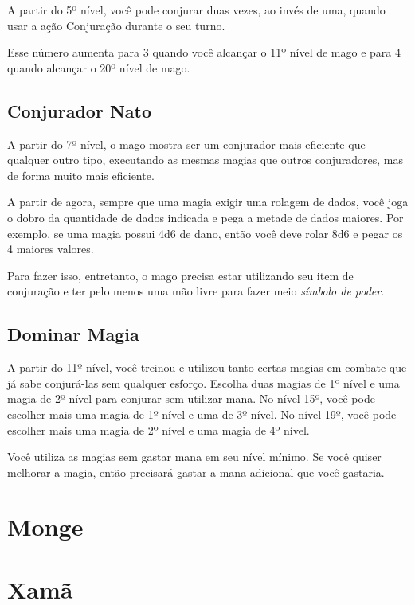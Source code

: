 \documentclass{RPG_Adventure}[2021/10/20]
\begin{document}
\begin{multicols}{2}
A partir do 5º nível, você pode conjurar duas vezes, ao invés de uma, quando
usar a ação Conjuração durante o seu turno.

Esse número aumenta para 3 quando você alcançar o 11º nível de mago e para 4
quando alcançar o 20º nível de mago.

\section*{Conjurador Nato}%
\label{sec:conjurador_nato}

A partir do 7º nível, o mago mostra ser um conjurador mais eficiente que
qualquer outro tipo, executando as mesmas magias que outros conjuradores, mas de
forma muito mais eficiente.

A partir de agora, sempre que uma magia exigir uma rolagem de dados, você joga o
dobro da quantidade de dados indicada e pega a metade de dados maiores. Por
exemplo, se uma magia possui 4d6 de dano, então você deve rolar 8d6 e pegar os
4 maiores valores.

Para fazer isso, entretanto, o mago precisa estar utilizando seu item de
conjuração e ter pelo menos uma mão livre para fazer meio \textit{símbolo de
poder}.

\section*{Dominar Magia}%

A partir do 11º nível, você treinou e utilizou tanto certas magias em combate
que já sabe conjurá-las sem qualquer esforço. Escolha duas magias de 1º nível e
uma magia de 2º nível para conjurar sem utilizar mana. No nível 15º, você pode
escolher mais uma magia de 1º nível e uma de 3º nível. No nível 19º, você pode
escolher mais uma magia de 2º nível e uma magia de 4º nível.

Você utiliza as magias sem gastar mana em seu nível mínimo. Se você quiser
melhorar a magia, então precisará gastar a mana adicional que você gastaria.

\end{multicols}


\chapter{Monge}%
\label{cha:monge}
\begin{multicols}{2}
\end{multicols}


\chapter{Xamã}%
\label{cha:xama}
\begin{multicols}{2}
\end{multicols}
\end{document}
